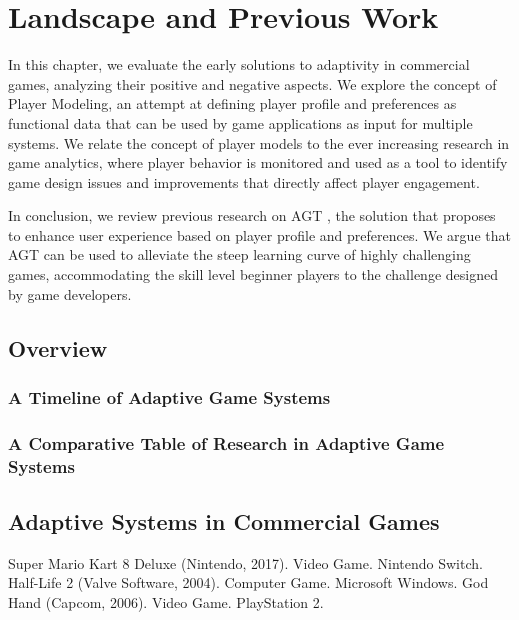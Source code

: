 \chapter{Landscape and Previous Work}

In this chapter, we evaluate the early solutions to adaptivity in commercial games, analyzing their positive and negative aspects. We explore the concept of Player Modeling, an attempt at defining player profile and preferences as functional data that can be used by game applications as input for multiple systems. We relate the concept of player models to the ever increasing research in game analytics, where player behavior is monitored and used as a tool to identify game design issues and improvements that directly affect player engagement.

In conclusion, we review previous research on AGT \cite{ARTICLE_PlayerCentredGameDesign}, the solution that proposes to enhance user experience based on player profile and preferences. We argue that AGT can be used to alleviate the steep learning curve of highly challenging games, accommodating the skill level beginner players to the challenge designed by game developers.

\section{Overview}

\subsection{A Timeline of Adaptive Game Systems}

\subsection{A Comparative Table of Research in Adaptive Game Systems}

\section{Adaptive Systems in Commercial Games}

     {Super Mario Kart 8 Deluxe (Nintendo, 2017). Video Game. Nintendo Switch.}
    {Half-Life 2 (Valve Software, 2004). Computer Game. Microsoft Windows.}
       {God Hand (Capcom, 2006). Video Game. PlayStation 2.}

